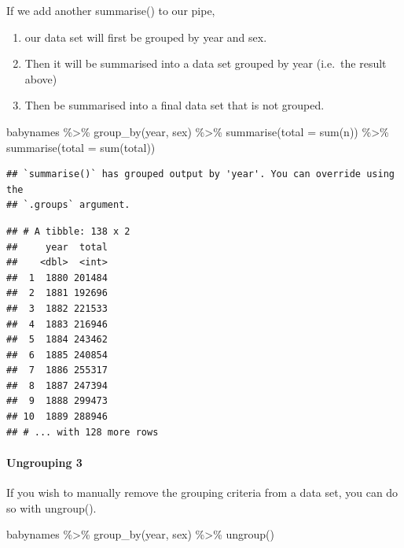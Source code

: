 \documentclass[
]{article}
\newenvironment{Shaded}{\begin{snugshade}}{\end{snugshade}}
\newcommand{\AttributeTok}[1]{\textcolor[rgb]{0.77,0.63,0.00}{#1}}
\newcommand{\FunctionTok}[1]{\textcolor[rgb]{0.00,0.00,0.00}{#1}}
\newcommand{\NormalTok}[1]{#1}
\newcommand{\SpecialCharTok}[1]{\textcolor[rgb]{0.00,0.00,0.00}{#1}}
\providecommand{\tightlist}{%
  \setlength{\itemsep}{0pt}\setlength{\parskip}{0pt}}
\begin{document}
If we add another summarise() to our pipe,

\begin{enumerate}
\def\labelenumi{\arabic{enumi}.}
\tightlist
\item
  our data set will first be grouped by year and sex.
\item
  Then it will be summarised into a data set grouped by year (i.e.~the
  result above)
\item
  Then be summarised into a final data set that is not grouped.
\end{enumerate}

\begin{Shaded}
\begin{Highlighting}[]
\NormalTok{babynames }\SpecialCharTok{\%\textgreater{}\%}
  \FunctionTok{group\_by}\NormalTok{(year, sex) }\SpecialCharTok{\%\textgreater{}\%} 
  \FunctionTok{summarise}\NormalTok{(}\AttributeTok{total =} \FunctionTok{sum}\NormalTok{(n)) }\SpecialCharTok{\%\textgreater{}\%} 
  \FunctionTok{summarise}\NormalTok{(}\AttributeTok{total =} \FunctionTok{sum}\NormalTok{(total))}
\end{Highlighting}
\end{Shaded}

\begin{verbatim}
## `summarise()` has grouped output by 'year'. You can override using the
## `.groups` argument.
\end{verbatim}

\begin{verbatim}
## # A tibble: 138 x 2
##     year  total
##    <dbl>  <int>
##  1  1880 201484
##  2  1881 192696
##  3  1882 221533
##  4  1883 216946
##  5  1884 243462
##  6  1885 240854
##  7  1886 255317
##  8  1887 247394
##  9  1888 299473
## 10  1889 288946
## # ... with 128 more rows
\end{verbatim}

\hypertarget{ungrouping-3}{%
\paragraph{Ungrouping 3}\label{ungrouping-3}}

If you wish to manually remove the grouping criteria from a data set,
you can do so with ungroup().

\begin{Shaded}
\begin{Highlighting}[]
\NormalTok{babynames }\SpecialCharTok{\%\textgreater{}\%}
  \FunctionTok{group\_by}\NormalTok{(year, sex) }\SpecialCharTok{\%\textgreater{}\%} 
  \FunctionTok{ungroup}\NormalTok{()}
\end{Highlighting}
\end{Shaded}
\end{document}
